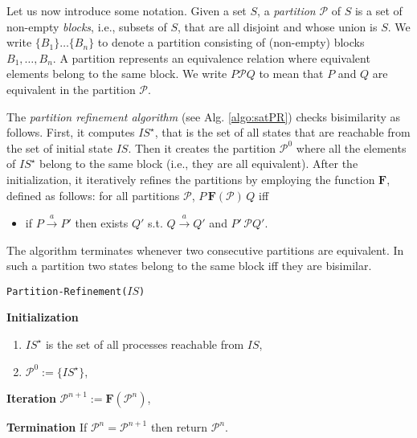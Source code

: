 \documentclass[copyright,creativecommons]{eptcs}
\newcommand{\rrarrow}{\longrightarrow}
\newcommand{\trans}[1]{\stackrel{#1}{\rrarrow}}
\newcommand{\tr}[1]{\trans{#1}}
\begin{document}
Let us now introduce some notation. Given a set $S$, a \emph{partition} $\mathcal{P}$ of $S$ is a set of non-empty
\emph{blocks}, i.e., subsets of $S$, that are all disjoint and whose
union is $S$. We write $\{B_1\}\dots \{B_n\}$ to denote a partition consisting
of (non-empty) blocks $B_1, \dots, B_n$. A partition represents an equivalence relation
where equivalent elements belong to the same block. We write $P \mathcal{P} Q$ to mean that $P$ and $Q$ are equivalent in the partition
$\mathcal{P}.$

The \emph{partition refinement algorithm} (see Alg. \ref{algo:satPR}) checks bisimilarity as follows.
First, it computes $IS^{\star}$, that is the set of
all states that are reachable from the set of initial state $IS$. Then it creates the
partition $\mathcal{P}^0$ where all the elements of $IS^{\star}$ belong to
the same block (i.e., they are all equivalent). After the initialization, it iteratively refines the
partitions by employing the function $\mathbf{F}$, defined as follows:
for all partitions $\mathcal{P}$,
$P \, \mathbf{F}(\mathcal{P})\, Q$ iff
\begin{itemize}
 \item if $P\tr{a}P'$ then exists $Q'$ s.t. $Q\tr{a}Q'$ and  $P'\, \mathcal{P} Q'$.
\end{itemize}
The algorithm terminates whenever two consecutive partitions are
equivalent. In such a partition two states belong to the same block iff they are bisimilar.





\begin{algorithm}\caption{\texttt{Partition-Refinement($IS$)}}\label{algo:satPR}
\textbf{Initialization}
\begin{enumerate}
\item $IS^{\star}$ is the set of all processes reachable from $IS$,
\item $\mathcal{P}^0:=\{IS^{\star}\}$,
\end{enumerate}
\textbf{Iteration} $\mathcal{P}^{n+1}:=\mathbf{F}(\mathcal{P}^n)$,

\textbf{Termination} If $\mathcal{P}^n=\mathcal{P}^{n+1}$ then return $\mathcal{P}^n$.
\end{algorithm}
\end{document}

